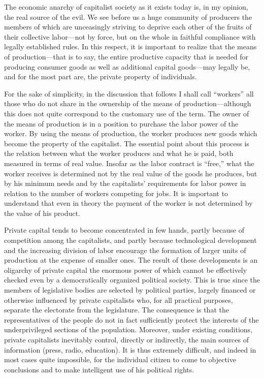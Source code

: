 \documentclass[12pt]{article}
\begin{document}
The economic anarchy of capitalist society as it exists today is, in my opinion, the real source of the evil. We see before us a huge community of producers the members of which are unceasingly striving to deprive each other of the fruits of their collective labor—not by force, but on the whole in faithful compliance with legally established rules. In this respect, it is important to realize that the means of production—that is to say, the entire productive capacity that is needed for producing consumer goods as well as additional capital goods—may legally be, and for the most part are, the private property of individuals.

For the sake of simplicity, in the discussion that follows I shall call “workers” all those who do not share in the ownership of the means of production—although this does not quite correspond to the customary use of the term. The owner of the means of production is in a position to purchase the labor power of the worker. By using the means of production, the worker produces new goods which become the property of the capitalist. The essential point about this process is the relation between what the worker produces and what he is paid, both measured in terms of real value. Insofar as the labor contract is “free,” what the worker receives is determined not by the real value of the goods he produces, but by his minimum needs and by the capitalists’ requirements for labor power in relation to the number of workers competing for jobs. It is important to understand that even in theory the payment of the worker is not determined by the value of his product.

Private capital tends to become concentrated in few hands, partly because of competition among the capitalists, and partly because technological development and the increasing division of labor encourage the formation of larger units of production at the expense of smaller ones. The result of these developments is an oligarchy of private capital the enormous power of which cannot be effectively checked even by a democratically organized political society. This is true since the members of legislative bodies are selected by political parties, largely financed or otherwise influenced by private capitalists who, for all practical purposes, separate the electorate from the legislature. The consequence is that the representatives of the people do not in fact sufficiently protect the interests of the underprivileged sections of the population. Moreover, under existing conditions, private capitalists inevitably control, directly or indirectly, the main sources of information (press, radio, education). It is thus extremely difficult, and indeed in most cases quite impossible, for the individual citizen to come to objective conclusions and to make intelligent use of his political rights.
\end{document}
